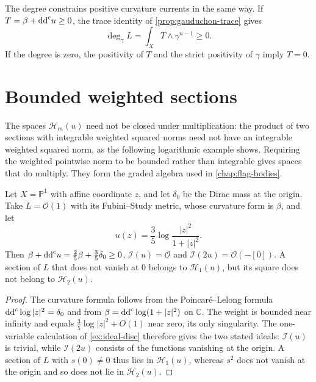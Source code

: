 The degree constrains positive curvature currents in the same way. If $T=\beta+\mathrm{dd}^{\mathrm{c}} u\geq0$, the trace identity of \cref{prop:gauduchon-trace} gives
\[
 \deg_\gamma L=\int_X T\wedge\gamma^{n-1}\geq0.
\]
If the degree is zero, the positivity of $T$ and the strict positivity of $\gamma$ imply $T=0$.



\section{Bounded weighted sections}\label{sec:bounded-section-algebra}

The spaces $\mathcal H_m(u)$ need not be closed under multiplication: the product of two sections with integrable weighted squared norms need not have an integrable weighted squared norm, as the following logarithmic example shows. Requiring the weighted pointwise norm to be bounded rather than integrable gives spaces that do multiply. They form the graded algebra used in \cref{chap:flag-bodies}.

\begin{example}\label{ex:multiplier-sections-not-graded}
Let $X=\mathbb P^1$ with affine coordinate $z$, and let $\delta_0$ be the Dirac mass at the origin. Take $L=\mathcal O(1)$ with its Fubini--Study metric, whose curvature form is $\beta$, and let
\[
 u(z)=\frac35\log\frac{|z|^2}{1+|z|^2}.
\]
Then $\beta+\mathrm{dd}^{\mathrm{c}} u=\frac25\beta+\frac35\delta_0\geq0$,
$\mathcal I(u)=\mathcal O$ and $\mathcal I(2u)=\mathcal O(-[0])$. A section of $L$ that does not vanish at $0$ belongs to $\mathcal H_1(u)$, but its square does not belong to $\mathcal H_2(u)$.
\end{example}
\begin{proof}
The curvature formula follows from the Poincar\'e--Lelong formula $\mathrm{dd}^{\mathrm{c}}\log|z|^2=\delta_0$ and from $\beta=\mathrm{dd}^{\mathrm{c}}\log(1+|z|^2)$ on $\mathbb C$. The weight is bounded near infinity and equals $\frac35\log|z|^2+O(1)$ near zero, its only singularity. The one-variable calculation of \cref{ex:ideal-disc} therefore gives the two stated ideals: $\mathcal I(u)$ is trivial, while $\mathcal I(2u)$ consists of the functions vanishing at the origin. A section of $L$ with $s(0)\neq0$ thus lies in $\mathcal H_1(u)$, whereas $s^2$ does not vanish at the origin and so does not lie in $\mathcal H_2(u)$.
\end{proof}

